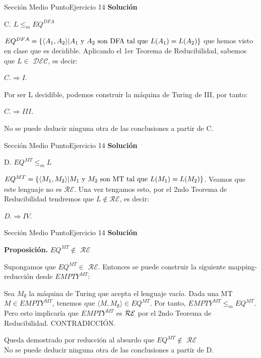 \documentclass[10pt, envcountsect, presentation, aspectratio=169]{beamer}
\newcommand{\ld}{\ensuremath{\mathcal {DEC}}}
\newcommand{\lr}{\ensuremath{\mathcal {RE}}}
\begin{document}
\begin{frame}{Sección Medio Punto}{Ejercicio 14}
    \textbf{Solución}\\
     \begin{center}
        C. $L \le_m  EQ^{DFA}$  
    \end{center}
    $EQ^{DFA} = \{\langle A_1, A_2\rangle \space | \space A_1 \text{ y } A_2 \text{ son DFA tal que } L(A_1) = L(A_2)\}$  que hemos visto en clase que es decidible.
    \vspace{3mm}
    Aplicando el 1er Teorema de Reducibilidad, sabemos que $L\in$ \ld, es decir: 
    \begin{center}
        $C. \Rightarrow I.$
    \end{center}
    Por ser L decidible, podemos construir la máquina de Turing de III, por tanto: 
    \begin{center}
        $C. \Rightarrow III.$
    \end{center}
    No se puede deducir ninguna otra de las conclusiones a partir de C.
     
\end{frame}

\begin{frame}{Sección Medio Punto}{Ejercicio 14}
    \textbf{Solución}\\
     \begin{center}
        D. $EQ^{MT} \le_m L$   
    \end{center}
    $EQ^{MT} = \{\langle M_1, M_2\rangle \space | \space M_1 \text{ y } M_2 \text{ son MT tal que } L(M_1) = L(M_2)\}$. Veamos que este lenguaje no es \lr. Una vez tengamos esto, por el 2ndo Teorema de Reducibilidad tendremos que $L\notin \lr$, es decir:
    \begin{center}
        $D. \Rightarrow IV.$
    \end{center}
\end{frame}


\begin{frame}{Sección Medio Punto}{Ejercicio 14}
    \textbf{Solución}\\
     \begin{center}
        \textbf{Proposición.} $EQ^{MT} \notin$ \lr
    \end{center}
    Supongamos que $EQ^{MT}\in$ \lr. Entonces se puede construir la siguiente mapping-reducción desde $EMPTY^{MT}$:
    
    \vspace{3mm}
    Sea $M_{\emptyset}$ la máquina de Turing que acepta el lenguaje vacío. Dada una MT $M \in EMPTY^{MT}$, tenemos que $\langle M, M_{\emptyset}\rangle \in EQ^{MT}$. Por tanto, $EMPTY^{MT} \leq_{m} EQ^{MT}$. Pero esto implicaría que $EMPTY^{MT}$ es $\mathcal{RE} \space$ por el 2ndo Teorema de Reducibilidad. CONTRADICCIÓN.
    
    \vspace{3mm}
    Queda demostrado por reducción al absurdo que $EQ^{MT} \notin$ \lr\\
    
    \vspace{3mm}
    No se puede deducir ninguna otra de las conclusiones a partir de D.
    
\end{frame}
\end{document}
